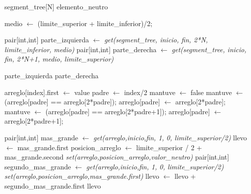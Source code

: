 \begin{algorithmic}
	 
		\State \Return segment_tree[N]
	\EndIf
	 
		\State \Return elemento_neutro
	\EndIf


	\State medio $\gets$ (limite_superior + limite_inferior)/2;
	
	\State pair[int,int] parte_izquierda $\gets$ \textit{get(segment_tree, inicio, fin, 2*N, limite_inferior, medio)}
	\State pair[int,int] parte_derecha $\gets$ \textit{get(segment_tree, inicio, fin, 2*N+1, medio, limite_superior)}
	
		\State \Return parte_izquierda
	\Else
		\State \Return parte_derecha
	\EndIf


\EndFunction
\end{algorithmic}
\hspace{.5cm}



\begin{algorithmic}
	\State arreglo[index].first $\gets$ value
	\State padre $\gets$ index/2
	\State mantuve $\gets$ false
		 	\State mantuve $\gets$ (arreglo[padre] == arreglo[2*padre]);
			\State arreglo[padre] $\gets$ arreglo[2*padre]; 	
		\Else
			\State mantuve $\gets$ (arreglo[padre] == arreglo[2*padre+1]);
		 	\State arreglo[padre] $\gets$ arreglo[2*padre+1];
		\EndIf
	\EndWhile 
\EndFunction
\end{algorithmic}
\hspace{.5cm}

\begin{algorithmic}

	\State pair[int,int] mas_grande $\gets$ \textit{get(arreglo,inicio,fin, 1, 0, limite_superior/2)} 
	\State llevo $\gets$ mas_grande.first
	\State posicion_arreglo $\gets$ limite_superior / 2 + mas_grande.second
	\State \textit{set(arreglo,posicion_arreglo,valor_neutro)} 
	\State pair[int,int] segundo_mas_grande $\gets$ \textit{get(arreglo,inicio,fin, 1, 0, limite_superior/2)} 
	\State \textit{set(arreglo,posicion_arreglo,mas_grande.first)} 
	\State llevo $\gets$ llevo + segundo_mas_grande.first 
	\State \Return llevo

\EndFunction
\end{algorithmic}
\hspace{.5cm}

